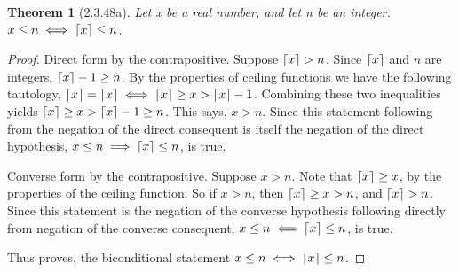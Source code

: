 \documentclass[a4paper, 12pt]{article}
\theoremstyle{plain}
\newtheorem*{theorem*}{Theorem}
\DeclarePairedDelimiter{\ceil}{\lceil}{\rceil}
\begin{document}
	
	\begin{theorem*}[2.3.48a]
		Let x be a real number, and let n be an integer. \newline $x \le n \iff \ceil{x} \le n$.
	\end{theorem*}
	
	\begin{proof}
		Direct form by the contrapositive. Suppose $\ceil{x} > n$. Since $\ceil{x}$ and $n$ are integers, $\ceil{x} - 1 \ge n$. By the properties of ceiling functions we have the following tautology, $\ceil{x} = \ceil{x} \iff \ceil{x} \ge x > \ceil{x} - 1$. Combining these two inequalities yields $\ceil{x} \ge x > \ceil{x} - 1 \ge n$. This says, $x > n$. Since this statement following from the negation of the direct consequent is itself the negation of the direct hypothesis, $x \le n \implies \ceil{x} \le n$, is true.
		
		Converse form by the contrapositive. Suppose $x > n$. Note that $\ceil{x} \ge x$, by the properties of the ceiling function. So if $x > n$, then $\ceil{x} \ge x > n$, and $\ceil{x} > n$. Since this statement is the negation of the converse hypothesis following directly from negation of the converse consequent, \newline $x \le n \impliedby \ceil{x} \le n$, is true.
		
		Thus proves, the biconditional statement $x \le n \iff \ceil{x} \le n$. 
	\end{proof}
\end{document}
